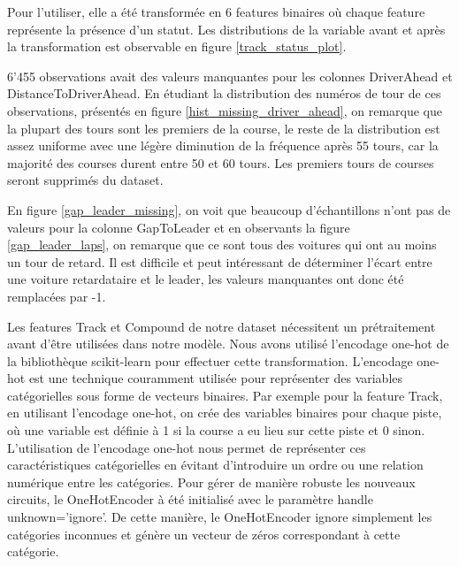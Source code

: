 Pour l'utiliser, elle a été transformée en 6 features binaires où chaque feature représente la présence d'un statut.
Les distributions de la variable avant et après la transformation est observable en figure \ref{track_status_plot}.

6'455 observations avait des valeurs manquantes pour les colonnes DriverAhead et DistanceToDriverAhead. En étudiant la distribution des numéros de tour de ces observations,
présentés en figure \ref{hist_missing_driver_ahead}, on remarque que la plupart des tours sont les premiers de la course,
le reste de la distribution est assez uniforme avec une légère diminution de la fréquence après 55 tours, car la majorité des courses durent entre 50 et 60 tours.
Les premiers tours de courses seront supprimés du dataset.


En figure \ref{gap_leader_missing}, on voit que beaucoup d'échantillons n'ont pas de valeurs pour la colonne GapToLeader et en observants la figure \ref{gap_leader_laps}, on remarque que ce sont tous des voitures qui ont au moins un tour de retard.
Il est difficile et peut intéressant de déterminer l'écart entre une voiture retardataire et le leader, les valeurs manquantes ont donc été remplacées par -1.



Les features Track et Compound de notre dataset nécessitent un prétraitement avant d'être utilisées dans notre modèle. Nous avons utilisé l'encodage one-hot de la bibliothèque scikit-learn pour effectuer cette transformation.
L'encodage one-hot est une technique couramment utilisée pour représenter des variables catégorielles sous forme de vecteurs binaires.
Par exemple pour la feature Track, en utilisant l'encodage one-hot, on crée des variables binaires pour chaque piste, où une variable est définie à 1 si la course a eu lieu sur cette piste et 0 sinon.
L'utilisation de l'encodage one-hot nous permet de représenter ces caractéristiques catégorielles en évitant d'introduire un ordre ou une relation numérique entre les catégories.
Pour gérer de manière robuste les nouveaux circuits, le OneHotEncoder à été initialisé avec le paramètre handle unknown='ignore'.
De cette manière, le OneHotEncoder ignore simplement les catégories inconnues et génère un vecteur de zéros correspondant à cette catégorie.

